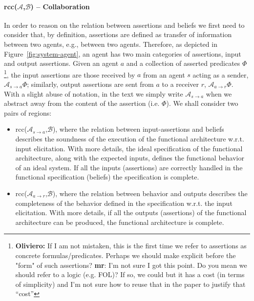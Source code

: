 \documentclass[conference]{IEEEtran}
\newcommand{\fixnote}[2]{\textbf{\color{red}{FIX}}\footnote{{\bf #1:} #2}}
\newcommand{\assertionRegion}{\mathcal{A}}
\newcommand{\beliefRegion}{\mathcal{B}}
\newcommand{\Rcc}[2]{rcc(#1,#2)}
\newcommand{\rassert}[3]{\mathcal{A}_{#1\rightarrow #2}#3}
\begin{document}
\paragraph{\Rcc{$\assertionRegion$}{$\beliefRegion$} -- Collaboration} In order
to reason on the relation between assertions and beliefs we first need to
consider that, by definition, assertions are defined as transfer of information
between two agents, e.g., between two agents.  Therefore, as depicted in
Figure~\ref{fig:system-agent}, an agent has two main categories of assertions,
input and output assertions.  Given an agent $a$ and a collection of asserted
predicates $\Phi$
\fixnote{Oliviero}{If I am not mistaken, this is the first time we refer to assertions as concrete formulas/predicates. Perhaps we should make explicit before the "form" of such assertions? {\bf mr}: I'm not sure I got this point. Do you mean we should refer to a logic (e.g. FOL)? If so, we could but it has a cost (in terms of simplicity) and I'm not sure how to reuse that in the paper to justify that ``cost''},
the input assertions are those received by $a$ from an agent
$s$ acting as a sender, $\rassert{s}{a}{\Phi}$; similarly, output assertions
are sent from $a$ to a receiver $r$, $\rassert{a}{r}{\Phi}$. With a slight abuse
of notation, in the text we simply write $\assertionRegion_{s\rightarrow a}$ when we abstract
away from the content of the assertion (i.e. $\Phi$).
We shall consider
two pairs of regions:%
\begin{itemize}
	\item \Rcc{$\assertionRegion_{s\rightarrow a}$}{$\beliefRegion$},
		where the relation between input-assertions and beliefs
		describes the soundness of the execution of the functional
		architecture w.r.t. input elicitation. With more details, the
		ideal specification of the functional architecture, along with
		the expected inputs, defines the functional behavior of an
		ideal system.  If all the inputs (assertions) are correctly
		handled in the functional specification (beliefs) the
		specification is complete. 

	\item \Rcc{$\assertionRegion_{a\rightarrow r}$}{$\beliefRegion$},
		where the relation between behavior and outputs describes the
		completeness of the behavior defined in the specification
		w.r.t. the input elicitation.  With more details, if all the
		outputs (assertions) of the functional architecture can be
		produced, the functional architecture is complete.
\end{itemize}
\end{document}
